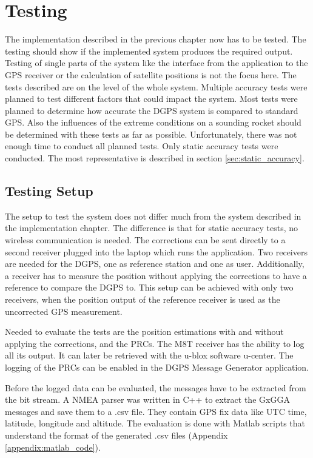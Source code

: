 \chapter{Testing}

The implementation described in the previous chapter now has to be tested.
The testing should show if the implemented system produces the required output.
Testing of single parts of the system like the interface from the application to the GPS receiver or the calculation of satellite positions is not the focus here.
The tests described are on the level of the whole system.
Multiple accuracy tests were planned to test different factors that could impact the system.
Most tests were planned to determine how accurate the DGPS system is compared to standard GPS.
Also the influences of the extreme conditions on a sounding rocket should be determined with these tests as far as possible.
Unfortunately, there was not enough time to conduct all planned tests.
Only static accuracy tests were conducted.
The most representative is described in section \ref{sec:static_accuracy}.


\section{Testing Setup}

The setup to test the system does not differ much from the system described in the implementation chapter.
The difference is that for static accuracy tests, no wireless communication is needed.
The corrections can be sent directly to a second receiver plugged into the laptop which runs the application.
Two receivers are needed for the DGPS, one as reference station and one as user.
Additionally, a receiver has to measure the position without applying the corrections to have a reference to compare the DGPS to.
This setup can be achieved with only two receivers, when the position output of the reference receiver is used as the uncorrected GPS measurement.

Needed to evaluate the tests are the position estimations with and without applying the corrections, and the PRCs.
The M8T receiver has the ability to log all its output.
It can later be retrieved with the u-blox software u-center.
The logging of the PRCs can be enabled in the DGPS Message Generator application.

Before the logged data can be evaluated, the messages have to be extracted from the bit stream.
A NMEA parser was written in C++ to extract the GxGGA messages and save them to a .csv file.
They contain GPS fix data like UTC time, latitude, longitude and altitude.
The evaluation is done with Matlab scripts that understand the format of the generated .csv files (Appendix \ref{appendix:matlab_code}).

